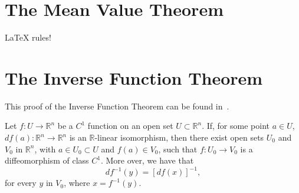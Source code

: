 \section{The Mean Value Theorem}\label{sec:the_mean_value_theorem}

\begin{theorem}\label{thm:the-mean-value-theorem}
	\LaTeX{} rules!
\end{theorem}

\section{The Inverse Function Theorem}\label{sec:the_inverse_function_theorem}

This proof of the Inverse Function Theorem can be found in~\cite{lang2012real}.

\begin{theorem}\label{thm:the-inverse-function-theorem}
	Let \(f:U\to\mathbb{R}^{n}\) be a \(C^{1}\) function on an open set \({U}\subset{\mathbb{R}^{n}}\). If, for some point \({a}\in{U}\), \(df(a):\mathbb{R}^{n}\to\mathbb{R}^{n}\) is an \(\mathbb{R}\)-linear isomorphism, then there exist open sets \(U_{0}\) and \(V_{0}\) in \(\mathbb{R}^{n}\), with \({a}\in{U_{0}}\subset{U}\) and \({f(a)}\in{V_{0}}\), such that \(f:U_{0}\to{V_{0}}\) is a diffeomorphism of class \(C^{1}\). More over, we have that
	\[
		df^{-1}(y)=[df(x)]^{-1},
	\]
	for every \(y\) in \(V_{0}\), where \(x=f^{-1}(y)\).
\end{theorem}

